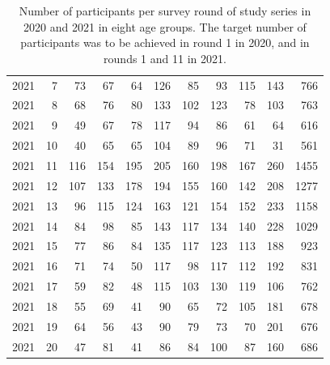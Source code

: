 \documentclass[fleqn,10pt]{wlscirep}
\begin{document}
\begin{table}[ht]
\begin{tabular}{rrrrrrrrrrr}
  2021 &   7 &  73 &  67 &  64 & 126 &  85 &  93 & 115 & 143 & 766 \\ 
  2021 &   8 &  68 &  76 &  80 & 133 & 102 & 123 &  78 & 103 & 763 \\ 
  2021 &   9 &  49 &  67 &  78 & 117 &  94 &  86 &  61 &  64 & 616 \\ 
  2021 &  10 &  40 &  65 &  65 & 104 &  89 &  96 &  71 &  31 & 561 \\ 
  2021 &  11 & 116 & 154 & 195 & 205 & 160 & 198 & 167 & 260 & 1455 \\ 
  2021 &  12 & 107 & 133 & 178 & 194 & 155 & 160 & 142 & 208 & 1277 \\ 
  2021 &  13 &  96 & 115 & 124 & 163 & 121 & 154 & 152 & 233 & 1158 \\ 
  2021 &  14 &  84 &  98 &  85 & 143 & 117 & 134 & 140 & 228 & 1029 \\ 
  2021 &  15 &  77 &  86 &  84 & 135 & 117 & 123 & 113 & 188 & 923 \\ 
  2021 &  16 &  71 &  74 &  50 & 117 &  98 & 117 & 112 & 192 & 831 \\ 
  2021 &  17 &  59 &  82 &  48 & 115 & 103 & 130 & 119 & 106 & 762 \\ 
  2021 &  18 &  55 &  69 &  41 &  90 &  65 &  72 & 105 & 181 & 678 \\ 
  2021 &  19 &  64 &  56 &  43 &  90 &  79 &  73 &  70 & 201 & 676 \\ 
  2021 &  20 &  47 &  81 &  41 &  86 &  84 & 100 &  87 & 160 & 686 \\ 
   \hline
\end{tabular}
\caption{\label{tab:part_round}Number of participants per survey round of study series in 2020 and 2021 in eight age groups. The target number of participants was to be achieved in round 1 in 2020, and in rounds 1 and 11 in 2021.} 
\end{table}
\end{document}
